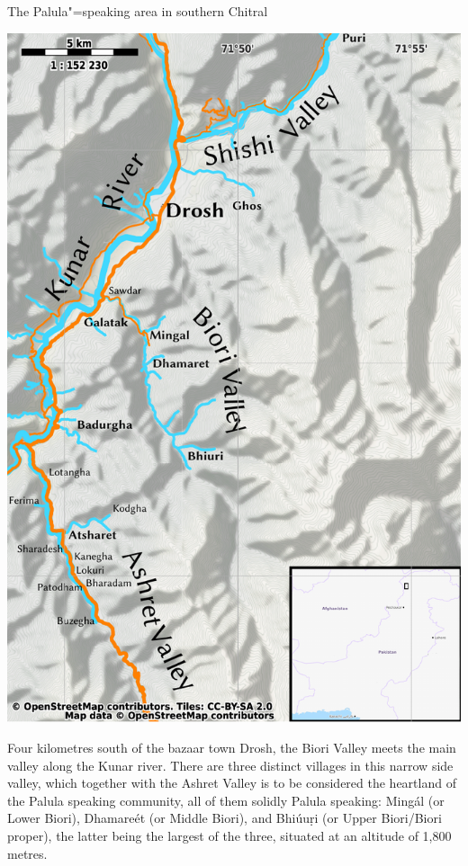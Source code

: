 \begin{mapfigure}[p!]
\caption{The Palula"=speaking area in southern Chitral}
\includegraphics[width=.95\textwidth]{figures/ch1mapSN.pdf}
\label{map:1-1}
\end{mapfigure}


Four kilometres south of the bazaar town Drosh, the Biori Valley meets the main valley along the Kunar river. There are three distinct villages in this narrow side valley, which together with the Ashret Valley is to be considered the heartland of the Palula speaking community, all of them solidly Palula speaking: Mingál (or Lower Biori), Dhamareét (or Middle Biori), and Bhiúuṛi (or Upper Biori/Biori proper), the latter being the largest of the three, situated at an altitude of 1,800 metres. 


